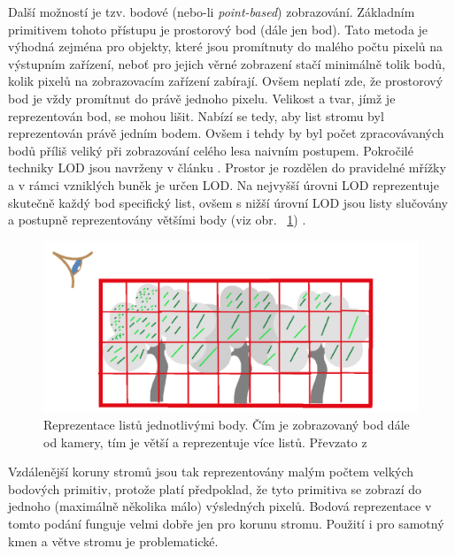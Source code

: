 Další možností je tzv. bodové (nebo-li \emph{point-based}) zobrazování. Základním primitivem tohoto přístupu je prostorový bod (dále jen bod). Tato metoda je výhodná zejména pro objekty, které jsou promítnuty do malého počtu pixelů na výstupním zařízení, neboť pro jejich věrné zobrazení stačí minimálně tolik bodů, kolik pixelů na zobrazovacím zařízení zabírají. Ovšem neplatí zde, že prostorový bod je vždy promítnut do právě jednoho pixelu. Velikost a tvar, jímž je reprezentován bod, se mohou lišit. Nabízí se tedy, aby list stromu byl reprezentován právě jedním bodem. Ovšem i tehdy by byl počet zpracovávaných bodů příliš veliký při zobrazování celého lesa naivním postupem. Pokročilé techniky LOD jsou navrženy v článku \cite{GMN05}. Prostor je rozdělen do pravidelné mřížky a v rámci vzniklých buněk je určen LOD. Na nejvyšší úrovni LOD reprezentuje skutečně každý bod specifický list, ovšem s nižší úrovní LOD jsou listy slučovány a postupně reprezentovány většími body (viz obr. ~\ref{fig:PB}) . 
\begin{figure}[!hbt]
\begin{center}
\includegraphics[width=1.0\textwidth]{./figures/point-based.png}
\end{center}
\caption[Reprezentace listů jednotlivými body]%
{Reprezentace listů jednotlivými body. Čím je zobrazovaný bod dále od kamery, tím je větší a reprezentuje více listů. Převzato z \cite{GMN05}
}
\label{fig:PB}
\end{figure}
 
Vzdálenější koruny stromů jsou tak reprezentovány malým počtem velkých bodových primitiv, protože platí předpoklad, že tyto primitiva se zobrazí do jednoho (maximálně několika málo) výsledných pixelů. Bodová reprezentace v tomto podání funguje velmi dobře jen pro korunu stromu. Použití i pro samotný kmen a větve stromu je problematické. 
\pagebreak
